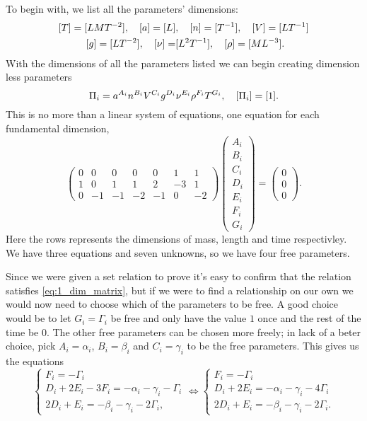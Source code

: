 \documentclass[11pt,letter, swedish, english
]{article}
\begin{document}
To begin with, we list all the parameters' dimensions:
\begin{equation}
\begin{aligned}
[T]=[LMT^{-2}]\qcomma [a]=[L]&\qcomma [n]=[T^{-1}]\qcomma [V]=[LT^{-1}]\\
[g]=[LT^{-2}]\qcomma [\nu]=&[L^2T^{-1}]\qcomma  [\rho]=[ML^{-3}].
\end{aligned}
\end{equation}
With the dimensions of all the parameters listed we can begin
creating dimension less parameters
\begin{equation}
\Pi_i = a^{A_i}n^{B_i} V^{C_i} g^{D_i} \nu^{E_i}\rho^{F_i} T^{G_i} \qcomma
[\Pi_i] = [1].
\end{equation}
This is no more than a linear system of equations, one equation for
each fundamental dimension,
\begin{equation}\label{eq:1_dim_matrix}
\begin{pmatrix}
0&0&0&0&0&1&1\\
1&0&1&1&2&-3&1\\
0&-1&-1&-2&-1&0&-2
\end{pmatrix}
\begin{pmatrix}
A_i\\B_i\\C_i\\D_i\\E_i\\F_i\\G_i
\end{pmatrix}
=\begin{pmatrix}
0\\0\\0
\end{pmatrix}.
\end{equation}
Here the rows represents the dimensions of mass, length and time respectivley.
We have three equations and seven unknowns, so we have four free
parameters. 

Since we were given a set relation to prove it's easy to confirm that
the relation satisfies \eqref{eq:1_dim_matrix}, but if we were to find
a relationship on our own we would now need to choose which of the
parameters to be free. A good choice would be to let $G_i=\Gamma_i$ be free and
only have the value $1$ once and the rest of the time be $0$. The
other free parameters can be chosen more freely; in lack of a beter
choice, pick $A_i=\alpha_i$, $B_i=\beta_i$ and $C_i=\gamma_i$ to be
the free parameters. 
This gives us the equations
\begin{equation}
\begin{cases}
F_i=-\Gamma_i\\
D_i+2E_i-3F_i=-\alpha_i-\gamma_i-\Gamma_i\\
2D_i+E_i=-\beta_i-\gamma_i-2\Gamma_i,
\end{cases}
\Longleftrightarrow
\begin{cases}
F_i=-\Gamma_i\\
D_i+2E_i=-\alpha_i-\gamma_i-4\Gamma_i\\
2D_i+E_i=-\beta_i-\gamma_i-2\Gamma_i.
\end{cases}
\end{equation}
\end{document}
